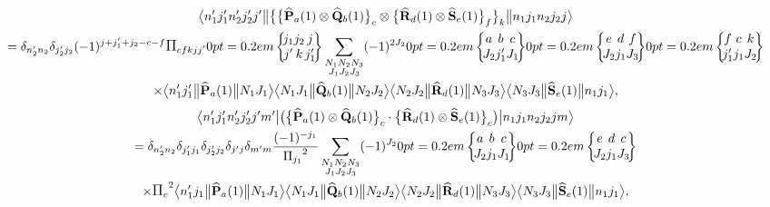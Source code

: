 \begin{multline*}
\braOketred{ n_{1}^{\prime} j_{1}^{\prime} n_{2}^{\prime} j_{2}^{\prime} j^{\prime}}{\bigl\{\bigl\{\widehat{\vect{P}}_{a}(1) \otimes \widehat{\vect{Q}}_{b}(1)\bigr\}_{c} \otimes\bigl\{\widehat{\vect{R}}_{d}(1) \otimes \widehat{\vect{S}}_{e}(1)\bigr\}_{f}\bigr\}_{k}}{n_{1} j_{1} n_{2} j_{2} j}\\
=\delta_{n_{2}^{\prime} n_{2}} \delta_{j_{2}^{\prime} j_{2}}(-1)^{j+j_{1}^{\prime}+j_{2}-c-f} \Fact{c f k j j^{\prime}}
\sixj{j_{1}}{j_{2}}{j}{j^{\prime}}{k}{j_{1}^{\prime}}  \sum_{\substack{N_{1} N_{2} N_{3} \\ J_{1} J_{2} J_{3}}}(-1)^{2 J_{2}}
\sixj{a}{b}{c}{J_{2}}{j_{1}^{\prime}}{J_{1}}
\sixj{e}{d}{f}{J_{2}}{j_{1}}{J_{3}}
\sixj{f}{c}{k}{j_{1}^{\prime}}{j_{1}}{J_{2}}\\
\times
\braOketred{n_{1}^{\prime} j_{1}^{\prime}}{\widehat{\vect{P}}_{a}(1)}{ N_{1} J_{1}}
\braOketred{ N_{1} J_{1}}{\widehat{\vect{Q}}_{b}(1)}{ N_{2} J_{2}}
\braOketred{ N_{2} J_{2}}{\widehat{\vect{R}}_{d}(1)}{ N_{3} J_{3}}
\braOketred{ N_{3} J_{3}}{\widehat{\vect{S}}_{e}(1)}{ n_{1} j_{1}},
\end{multline*}
\begin{multline} 
\braOket{ n_{1}^{\prime} j_{1}^{\prime} n_{2}^{\prime} j_{2}^{\prime} j^{\prime} m^{\prime}}{\bigl(\bigl\{\widehat{\vect{P}}_{a}(1) \otimes \widehat{\vect{Q}}_{b}(1)\bigr\}_{c} \cdot\bigl\{\widehat{\vect{R}}_{d}(1) \otimes \widehat{\vect{S}}_{e}(1)\bigr\}_{c}\bigr)}{n_{1} j_{1} n_{2} j_{2} j m} \\
=\delta_{n_{2}^{\prime} n_{2}} \delta_{j_{1}^{\prime} j_{1}} \delta_{j_{2}^{\prime} j_{2}} \delta_{j^{\prime} j} \delta_{m^{\prime} m} \frac{(-1)^{-j_{1}}}{\Fact{j_{1}}^{2}} \sum_{\substack{N_{1} N_{2} N_{3} \\ J_{1} J_{2} J_{3}}}(-1)^{J_{2}}
\sixj{a}{b}{c}{J_{2}}{j_{1}}{J_{1}}
\sixj{e}{d}{c}{J_{2}}{j_{1}}{J_{3}} \\
\times \Fact{c}^{2}
\braOketred{ n_{1}^{\prime} j_{1}}{\widehat{\vect{P}}_{a}(1)}{ N_{1} J_{1}}
\braOketred{ N_{1} J_{1}}{\widehat{\vect{Q}}_{b}(1)}{ N_{2} J_{2}}
\braOketred{ N_{2} J_{2}}{\widehat{\vect{R}}_{d}(1)}{ N_{3} J_{3}}
\braOketred{ N_{3} J_{3}}{\widehat{\vect{S}}_{e}(1)}{ n_{1} j_{1}},  \label{eq:13:1:47}
\end{multline}
